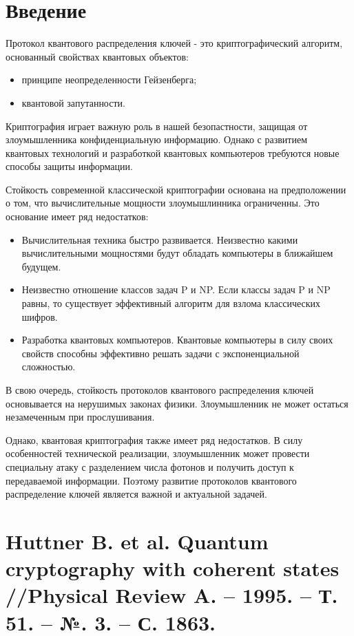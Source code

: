 





\section*{Введение}
Протокол квантового распределения ключей - это криптографический алгоритм, основанный свойствах квантовых объектов:

\begin{itemize}
\item принципе неопределенности Гейзенберга;
\item квантовой запутанности.
\end{itemize}

Криптография играет важную роль в нашей безопастности, защищая от злоумышленника конфиденциальную информацию. Однако с развитием квантовых технологий и разработкой квантовых компьютеров требуются новые способы защиты информации.

Стойкость современной классической криптографии основана на предположении о том, что вычислительные мощности злоумышлинника ограниченны. Это основание имеет ряд недостатков:

\begin{itemize}
\item Вычислительная техника быстро развивается. Неизвестно какими вычислительными мощностями будут обладать компьютеры в ближайшем будущем.
\item Неизвестно отношение классов задач P и NP. Если классы задач P и NP равны, то существует эффективный алгоритм для взлома классических шифров.
\item Разработка квантовых компьютеров. Квантовые компьютеры в силу своих свойств способны эффективно решать задачи с экспоненциальной сложностью.
\end{itemize}

В свою очередь, стойкость протоколов квантового распределения ключей основывается на нерушимых законах физики. Злоумышленник не может остаться незамеченным при прослушивания.

Однако, квантовая криптография также имеет ряд недостатков. В силу особенностей технической реализации, злоумышленник может провести специальну атаку с разделением числа фотонов и получить доступ к передаваемой информации. Поэтому развитие протоколов квантового распределение ключей является важной и актуальной задачей.


\section{Huttner B. et al. Quantum cryptography with coherent states //Physical Review A. – 1995. – Т. 51. – №. 3. – С. 1863.}
\blindtext
